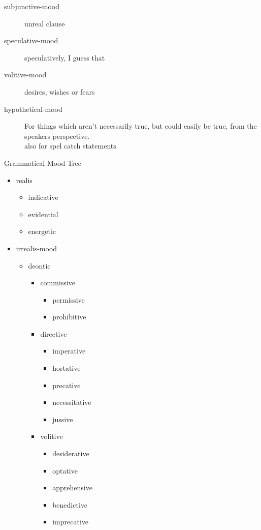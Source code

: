 \begin{multicols}{2}
\begin{description}
\item[subjunctive-mood]
unreal clause
\item[speculative-mood]
speculatively, I guess that
\item[volitive-mood]
desires, wishes or fears
\item[hypothetical-mood]
For things which aren't necessarily true, but could easily
be true, from the speakers perspective.\\
also for spel catch statements
\end{description}

\end{multicols}
\begin{table}
\caption{Grammatical Mood Tree}
\label{moodtree}
\begin{itemize}
\item realis
    \begin{itemize}
    \item indicative
    \item evidential
    \item energetic
    \end{itemize}

\item irrealis-mood
    \begin{itemize}
    \item deontic
        \begin{itemize}
            \item commissive
            \begin{itemize}
                \item permissive
                \item prohibitive
            \end{itemize}
            
            \item directive
            \begin{itemize}
                \item imperative
                \item hortative
                \item precative
                \item necessitative
                \item jussive
            \end{itemize}
            
            \item volitive
                \begin{itemize}
                    \item desiderative
                    \item optative
                    \item apprehensive
                    \item benedictive
                    \item imprecative
                \end{itemize}
            

\end{itemize}
\end{itemize}
\end{itemize}
\end{table}
